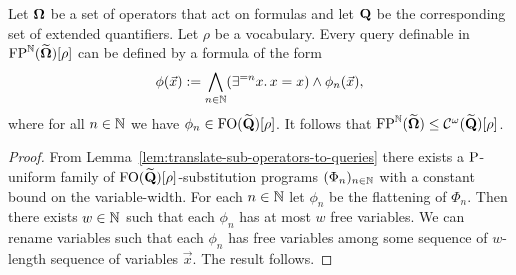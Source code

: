 \documentclass[../main/thesis.tex]{subfiles}
\begin{document}
\begin{prop}
  Let $\mathbf{\mathbf{\Omega}}$ be a set of operators that act on formulas and let $\mathbf{Q}$ be
  the corresponding set of extended quantifiers. Let $\rho$ be a vocabulary.
  Every query definable in $\text{\upshape FP}^{\mathbb{N}} (\widetilde{\mathbf{\mathbf{\Omega}}})[\rho]$ can be defined
  by a formula of the form
  \begin{align*}
    \phi (\vec{x}) := \bigwedge_{n \in \mathbb{N}}(\exists^{=n}x . \, x = x) \land \phi_n(\vec{x}),
  \end{align*}
  where for all $n \in \mathbb{N}$ we have $\phi_n \in
  \text{\upshape FO} (\widetilde{\mathbf{Q}})[\rho]$. It follows that
  $\text{\upshape FP}^{\mathbb{N}} (\widetilde{\mathbf{\mathbf{\Omega}}}) \leq
  \mathcal{C}^{\omega} (\widetilde{\mathbf{Q}})[\rho]$.
  \label{prop:FP-to-inf}
\end{prop}
\begin{proof}
  From Lemma~\ref{lem:translate-sub-operators-to-queries} there exists a
  $\mathrm{P}$-uniform family of $\text{\upshape FO} (\widetilde{\mathbf{Q}})[\rho]$-substitution programs
  $(\Phi_n)_{n \in \mathbb{N}}$ with a constant bound on the variable-width. For each
  $n \in \mathbb{N}$ let $\phi_n$ be the flattening of $\Phi_n$. Then there exists $w
  \in \mathbb{N}$ such that each $\phi_n$ has at most $w$ free variables. We can
  rename variables such that each $\phi_n$ has free variables among some
  sequence of $w$-length sequence of variables $\vec{x}$. The result follows.
\end{proof}



\end{document}
